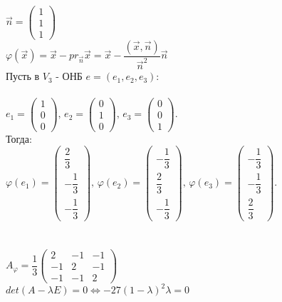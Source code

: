\documentclass[a4paper,12pt]{report}
\begin{document}
\\$\overrightarrow{n} = 
 \begin{pmatrix}
1 \\ 1 \\ 1
\end{pmatrix}$
\\$\varphi(\overrightarrow{x}) = \overrightarrow{x} - pr_{\overrightarrow{n}}{\overrightarrow{x}} = \overrightarrow{x} - \dfrac{(\overrightarrow{x},\overrightarrow{n})}{\overrightarrow{n}^2}\overrightarrow{n}
$
\\Пусть в $V_{3}$ - ОНБ $e=(e_{1}, e_{2}, e_{3}):$
\\
\\$e_{1} =  
\begin{pmatrix}
1 \\ 0 \\ 0
\end{pmatrix}, \, 
e_{2} =  
\begin{pmatrix}
0 \\ 1 \\ 0
\end{pmatrix}, \,
e_{3} =  
\begin{pmatrix}
0 \\ 0 \\ 1
\end{pmatrix}.$
\\Тогда:
\\$\varphi(e_{1}) =  
\begin{pmatrix}
\dfrac{2}{3} \\[0.25cm] -\dfrac{1}{3} \\[0.25cm] -\dfrac{1}{3}
\end{pmatrix}, \, 
\varphi(e_{2}) =
\begin{pmatrix}
-\dfrac{1}{3} \\[0.25cm] \dfrac{2}{3} \\[0.25cm] -\dfrac{1}{3}
\end{pmatrix}, \,
\varphi(e_{3}) =
\begin{pmatrix}
-\dfrac{1}{3} \\[0.25cm] -\dfrac{1}{3} \\[0.25cm] \dfrac{2}{3}
\end{pmatrix}.$
\\
\\
\\$A_{\varphi} = \dfrac{1}{3}$$\begin{pmatrix}
2 & -1 & -1
\\ -1 & 2&-1
\\-1 & -1 & 2
\end{pmatrix}$
\\	$det(A - \lambda E)=0 \Longleftrightarrow -27(1 - \lambda)^{2}\lambda = 0$
\\
\end{document}

